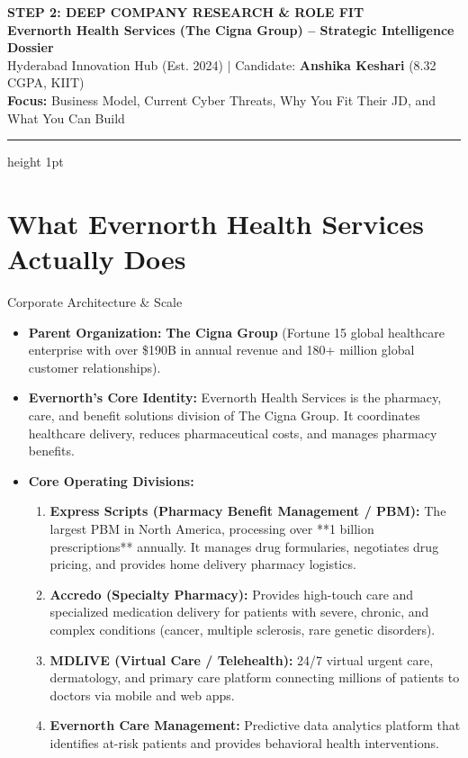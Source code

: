 \documentclass[11pt,a4paper]{article}
\begin{document}
\begin{center}
    {\LARGE \bfseries \color{primaryblue} STEP 2: DEEP COMPANY RESEARCH \& ROLE FIT}\\[4pt]
    {\large \bfseries Evernorth Health Services (The Cigna Group) -- Strategic Intelligence Dossier}\\[2pt]
    {\small \color{darkcharcoal} Hyderabad Innovation Hub (Est. 2024) $|$ Candidate: \textbf{Anshika Keshari} (8.32 CGPA, KIIT)}\\[2pt]
    {\footnotesize \textbf{Focus:} Business Model, Current Cyber Threats, Why You Fit Their JD, and What You Can Build}
\end{center}
\vspace{-4pt}
\hrule height 1pt
\vspace{8pt}

\section{What Evernorth Health Services Actually Does}

\begin{evernorthbox}{Corporate Architecture \& Scale}
\begin{itemize}
    \item \textbf{Parent Organization:} \textbf{The Cigna Group} (Fortune 15 global healthcare enterprise with over \$190B in annual revenue and 180+ million global customer relationships).
    \item \textbf{Evernorth's Core Identity:} Evernorth Health Services is the pharmacy, care, and benefit solutions division of The Cigna Group. It coordinates healthcare delivery, reduces pharmaceutical costs, and manages pharmacy benefits.
    \item \textbf{Core Operating Divisions:}
    \begin{enumerate}
        \item \textbf{Express Scripts (Pharmacy Benefit Management / PBM):} The largest PBM in North America, processing over **1 billion prescriptions** annually. It manages drug formularies, negotiates drug pricing, and provides home delivery pharmacy logistics.
        \item \textbf{Accredo (Specialty Pharmacy):} Provides high-touch care and specialized medication delivery for patients with severe, chronic, and complex conditions (cancer, multiple sclerosis, rare genetic disorders).
        \item \textbf{MDLIVE (Virtual Care / Telehealth):} 24/7 virtual urgent care, dermatology, and primary care platform connecting millions of patients to doctors via mobile and web apps.
        \item \textbf{Evernorth Care Management:} Predictive data analytics platform that identifies at-risk patients and provides behavioral health interventions.
    \end{enumerate}
\end{itemize}
\end{evernorthbox}
\end{document}
